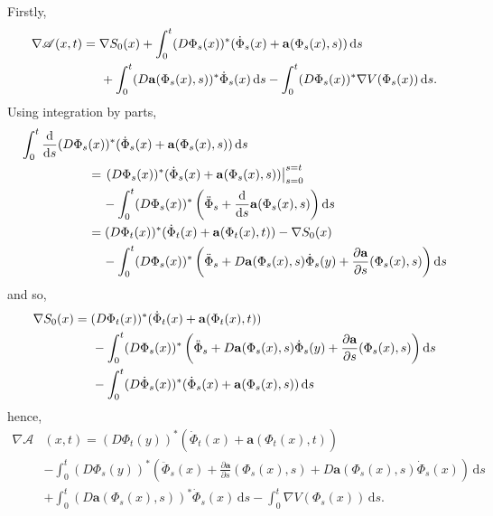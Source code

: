 \documentclass[a4paper,12pt,draft]{report}
\begin{document}
{
Firstly,
\begin{align}
\nabla\mathscr{A}(x, t) & = \nabla S_0(x) + \int_0^t(D\Phi_s(x))^*(\dot{\Phi}_s(x) + \mathbf{a}(\Phi_s(x), s))\,\mathrm{d}s\nonumber\\
& \hspace{0.5cm} + \int_0^t(D\mathbf{a}(\Phi_s(x), s))^*\dot{\Phi}_s(x)\,\mathrm{d}s - \int_0^t(D\Phi_s(x))^*\nabla V(\Phi_s(x))\,\mathrm{d}s.\nonumber
\end{align}
Using integration by parts,
\begin{align}
\int_0^t\frac{\mathrm{d}}{\mathrm{d}s}(D\Phi_s&(x))^*(\dot{\Phi}_s(x) + \mathbf{a}(\Phi_s(x), s))\,\mathrm{d}s\nonumber\\
& = \left.(D\Phi_s(x))^*(\dot{\Phi}_s(x) + \mathbf{a}(\Phi_s(x), s))\right|_{s = 0}^{s = t}\nonumber\\
& \hspace{0.4cm} - \int_0^t(D\Phi_s(x))^*\left(\ddot{\Phi}_s + \frac{\mathrm{d}}{\mathrm{d}s}\mathbf{a}(\Phi_s(x), s)\right)\mathrm{d}s\nonumber\\
& = (D\Phi_t(x))^*(\dot{\Phi}_t(x) + \mathbf{a}(\Phi_t(x), t)) - \nabla S_0(x)\nonumber\\
& \hspace{0.4cm} - \int_0^t(D\Phi_s(x))^*\left(\ddot{\Phi}_s + D\mathbf{a}(\Phi_s(x), s)\dot{\Phi}_s(y) + \frac{\partial\mathbf{a}}{\partial s}(\Phi_s(x), s)\right)\mathrm{d}s\nonumber
\end{align}
and so,
\begin{align}
\nabla S_0(x) & = (D\Phi_t(x))^*(\dot{\Phi}_t(x) + \mathbf{a}(\Phi_t(x), t))\nonumber\\
& \hspace{0.5cm} - \int_0^t(D\Phi_s(x))^*\left(\ddot{\Phi}_s + D\mathbf{a}(\Phi_s(x), s)\dot{\Phi}_s(y) + \frac{\partial\mathbf{a}}{\partial s}(\Phi_s(x), s)\right)\mathrm{d}s\nonumber\\
& \hspace{0.5cm} - \int_0^t(D\dot{\Phi}_s(x))^*(\dot{\Phi}_s(x) + \mathbf{a}(\Phi_s(x), s))\,\mathrm{d}s\nonumber
\end{align}
hence,
\begin{align}
\nabla\mathscr{A} & (x, t) = (D\Phi_t(y))^*(\dot{\Phi}_t(x) + \mathbf{a}(\Phi_t(x), t))\nonumber\\
& - \int_0^t(D\Phi_s(y))^*\left(\ddot{\Phi}_s(x) + \frac{\partial\mathbf{a}}{\partial s}(\Phi_s(x), s) + D\mathbf{a}(\Phi_s(x), s)\dot{\Phi}_s(x)\right)\,\mathrm{d}s\nonumber\\
& + \int_0^t(D\mathbf{a}(\Phi_s(x), s))^*\dot{\Phi}_s(x)\,\mathrm{d}s - \int_0^t\nabla V(\Phi_s(x))\,\mathrm{d}s.\nonumber

\end{align}}
\end{document}
